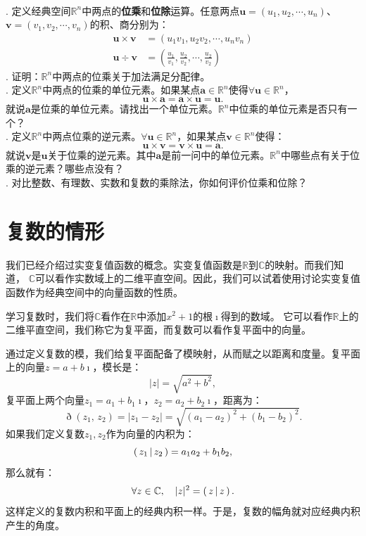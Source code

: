 \documentclass[12pt,UTF8]{ctexbook}
\begin{document}
\begin{xt}
    \mbox{} \\
    . 定义经典空间$\mathbb{R}^n$中两点的\textbf{位乘}和\textbf{位除}运算。任意两点$\mathbf{u} = (u_1, u_2, \cdots, u_n)$、$\mathbf{v} = (v_1, v_2, \cdots, v_n)$的积、商分别为：
    \begin{align*}
        \mathbf{u} \times \mathbf{v} &= (u_1 v_1, u_2 v_2, \cdots, u_n v_n) \\
        \mathbf{u} \div \mathbf{v} &= \left(\frac{u_1}{v_1}, \frac{u_2}{v_2}, \cdots, \frac{u_2}{v_2}\right)
    \end{align*}
    . 证明：$\mathbb{R}^n$中两点的位乘关于加法满足分配律。\\
    . 定义$\mathbb{R}^n$中两点的位乘的单位元素。如果某点$\mathbf{a}\in\mathbb{R}^n$使得$\forall \mathbf{u}\in\mathbb{R}^n$，
    $$\mathbf{u}\times \mathbf{a} = \mathbf{a}\times \mathbf{u} = \mathbf{u}.  $$
    就说$\mathbf{a}$是位乘的单位元素。请找出一个单位元素。$\mathbb{R}^n$中位乘的单位元素是否只有一个？\\
    . 定义$\mathbb{R}^n$中两点位乘的逆元素。$\forall \mathbf{u}\in\mathbb{R}^n$，如果某点$\mathbf{v}\in\mathbb{R}^n$使得：
    $$\mathbf{u}\times \mathbf{v} = \mathbf{v}\times \mathbf{u} = \mathbf{a}.  $$
    就说$\mathbf{v}$是$\mathbf{u}$关于位乘的逆元素。其中$\mathbf{a}$是前一问中的单位元素。$\mathbb{R}^n$中哪些点有关于位乘的逆元素？哪些点没有？\\
    . 对比整数、有理数、实数和复数的乘除法，你如何评价位乘和位除？
\end{xt}

\section{复数的情形}

我们已经介绍过实变复值函数的概念。实变复值函数是$\mathbb{R}$到$\mathbb{C}$的映射。而我们知道，
$\mathbb{C}$可以看作实数域上的二维平直空间。因此，我们可以试着使用讨论实变复值函数作为经典空间中的向量函数的性质。

学习复数时，我们将$\mathbb{C}$看作在$\mathbb{R}$中添加$x^2 + 1$的根$\imath$得到的数域。
它可以看作$\mathbb{R}$上的二维平直空间，我们称它为复平面，而复数可以看作复平面中的向量。

通过定义复数的模，我们给复平面配备了模映射，从而赋之以距离和度量。复平面上的向量$z = a + b\imath$，模长是：
$$ |z| = \sqrt{a^2 + b^2},$$
复平面上两个向量$z_1 = a_1 + b_1\imath$，$z_2 = a_2 + b_2\imath$，距离为：
$$ \eth(z_1,\, z_2) = |z_1 - z_2| = \sqrt{(a_1 - a_2)^2 + (b_1 - b_2)^2}. $$
如果我们定义复数$z_1, z_2$作为向量的内积为：
$$ \displaystyle\left( \,z_1 \,\middle\vert \,z_2 \,\right) = a_1a_2 + b_1b_2,$$
那么就有：
$$ \forall z \in \mathbb{C}, \quad |z|^2 = \displaystyle\left( \,z \,\middle\vert \,z \,\right). $$
这样定义的复数内积和平面上的经典内积一样。于是，复数的幅角就对应经典内积产生的角度。
\end{document}

